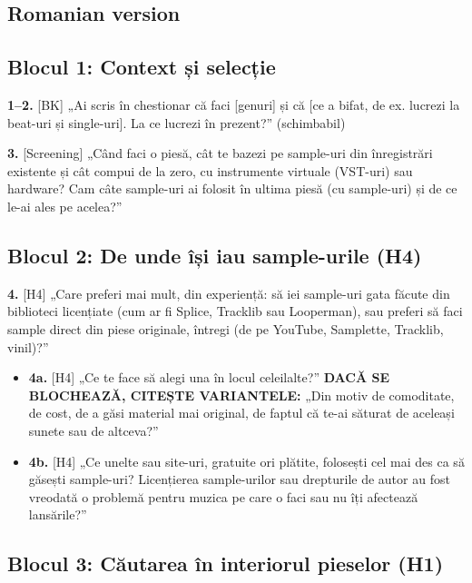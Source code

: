 \documentclass[12pt,a4paper]{report}
\newcommand{\cond}[1]{\textcolor{condition}{\textbf{#1}}}
\begin{document}
\begin{otherlanguage}{romanian}\frenchspacing
\chapter{Romanian version}

\section{Blocul 1: Context și selecție}

\textbf{1–2.} [BK] „Ai scris în chestionar că faci [genuri] și că [ce a bifat, de ex. lucrezi la beat-uri și single-uri]. La ce lucrezi în prezent?” (schimbabil)

\textbf{3.} [Screening] „Când faci o piesă, cât te bazezi pe sample-uri din înregistrări existente și cât compui de la zero, cu instrumente virtuale (VST-uri) sau hardware? Cam câte sample-uri ai folosit în ultima piesă (cu sample-uri) și de ce le-ai ales pe acelea?”

\section{Blocul 2: De unde își iau sample-urile (H4)}

\textbf{4.} [H4] „Care preferi mai mult, din experiență: să iei sample-uri gata făcute din biblioteci licențiate (cum ar fi Splice, Tracklib sau Looperman), sau preferi să faci sample direct din piese originale, întregi (de pe YouTube, Samplette, Tracklib, vinil)?”

\begin{itemize}
  \item \textbf{4a.} [H4] „Ce te face să alegi una în locul celeilalte?” \cond{DACĂ SE BLOCHEAZĂ, CITEȘTE VARIANTELE:} „Din motiv de comoditate, de cost, de a găsi material mai original, de faptul că te-ai săturat de aceleași sunete sau de altceva?”
  \item \textbf{4b.} [H4] „Ce unelte sau site-uri, gratuite ori plătite, folosești cel mai des ca să găsești sample-uri? Licențierea sample-urilor sau drepturile de autor au fost vreodată o problemă pentru muzica pe care o faci sau nu îți afectează lansările?”
\end{itemize}

\section{Blocul 3: Căutarea în interiorul pieselor (H1)}


\end{otherlanguage}
\end{document}

